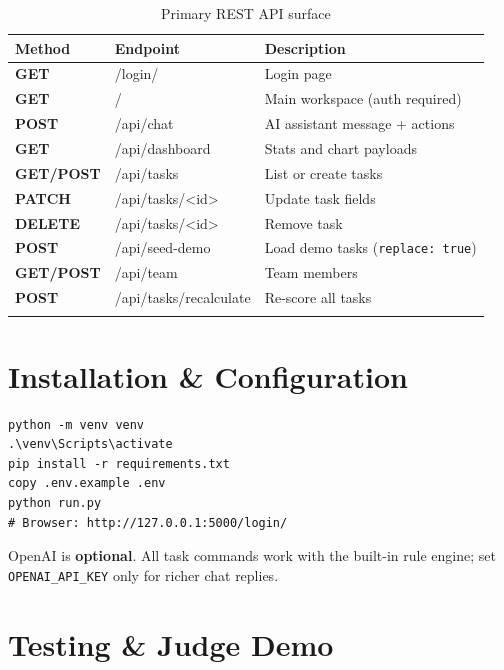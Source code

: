 \documentclass[11pt,a4paper,twoside=false]{report}
\begin{document}
\small
\renewcommand{\arraystretch}{1.3}
\begin{longtable}{@{}>{\sffamily\bfseries}p{1.5cm} >{\ttfamily\footnotesize}p{4.2cm} p{6.5cm}@{}}
\toprule
\sffamily Method & \sffamily Endpoint & \sffamily Description \\
\midrule
\endhead
GET & /login/ & Login page \\
GET & / & Main workspace (auth required) \\
POST & /api/chat & AI assistant message + actions \\
GET & /api/dashboard & Stats and chart payloads \\
GET/POST & /api/tasks & List or create tasks \\
PATCH & /api/tasks/<id> & Update task fields \\
DELETE & /api/tasks/<id> & Remove task \\
POST & /api/seed-demo & Load demo tasks (\texttt{replace: true}) \\
GET/POST & /api/team & Team members \\
POST & /api/tasks/recalculate & Re-score all tasks \\
\bottomrule
\caption{Primary REST API surface}
\end{longtable}
\normalsize

\chapter{Installation \& Configuration}

\begin{tcolorbox}[
  enhanced, colback=codebg, colframe=tpPurple!60,
  title={\color{white}\faIcon{terminal}\quad Quick Start --- Windows},
  coltitle=white, colbacktitle=tpPurple, arc=5pt,
  drop shadow
]
\begin{lstlisting}
python -m venv venv
.\venv\Scripts\activate
pip install -r requirements.txt
copy .env.example .env
python run.py
# Browser: http://127.0.0.1:5000/login/
\end{lstlisting}
\end{tcolorbox}

\begin{tpwarning}
OpenAI is \textbf{optional}. All task commands work with the built-in rule engine; set \texttt{OPENAI\_API\_KEY} only for richer chat replies.
\end{tpwarning}

\chapter{Testing \& Judge Demo}
\end{document}
